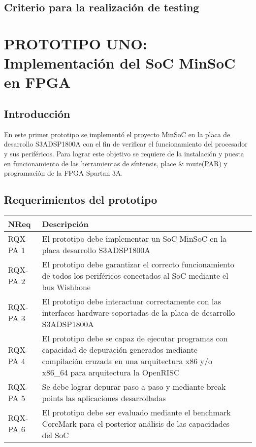 		\subsection{Criterio para la realización de testing}
		
	
	\section{PROTOTIPO UNO: Implementación del SoC MinSoC en FPGA}
		\subsection{Introducción}
		En este primer prototipo se implementó el proyecto MinSoC en la placa de desarrollo S3ADSP1800A con el fin de verificar el funcionamiento
		del procesador y sus periféricos. Para lograr este objetivo se requiere de la instalación y puesta en funcionamiento de las herramientas
		de síntensis, place \& route(PAR) y programación de la FPGA Spartan 3A. 
		
		\subsection{Requerimientos del prototipo}
		\begin{tabular}{ p{2.5cm} p{8cm} p{3cm} }
		\hline 
		\rowcolor[gray]{0.8} N\textordmasculine Req & Descripción\\
		\hline 
		RQX-PA 1 & El prototipo debe implementar un SoC MinSoC en la placa desarrollo S3ADSP1800A\\ 
		\hline 
		RQX-PA 2 & El prototipo debe garantizar el correcto funcionamiento de todos los periféricos conectados al SoC mediante el bus Wishbone\\ 
		\hline 
		RQX-PA 3 & El prototipo debe interactuar correctamente con las interfaces hardware soportadas de la placa de desarrollo S3ADSP1800A\\ 
		\hline
		RQX-PA 4 & El prototipo debe se capaz de ejecutar programas con capacidad de depuración generados mediante compilación
		cruzada en una arquitectura x86 y/o x86\_64 para arquitectura la OpenRISC\\
		\hline
		RQX-PA 5 & Se debe lograr depurar paso a paso y mediante break points las aplicaciones desarrolladas\\
		\hline
		RQX-PA 6 & El prototipo debe ser evaluado mediante el benchmark CoreMark para el posterior análisis de las capacidades del SoC\\
		\hline		
		\end{tabular}
		
